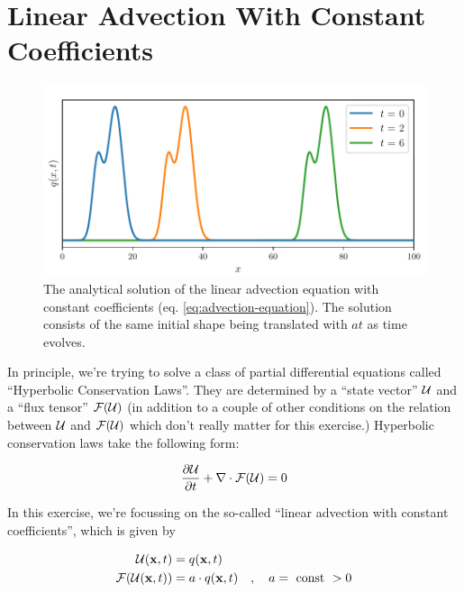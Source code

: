 \section{Linear Advection With Constant Coefficients}\label{chap:advection}


\begin{figure}[htbp]
	\includegraphics[width=\textwidth]{figures/linear_advection_solution.pdf}%
	\caption{
		The analytical solution of the linear advection equation with constant
		coefficients (eq. \ref{eq:advection-equation}). The solution consists
		of the same initial shape being translated with $a t$ as time evolves.
	}
	\label{fig:advection-analytical-solution}
\end{figure}


In principle, we're trying to solve a class of partial differential equations called
``Hyperbolic Conservation Laws''. They are determined by a ``state vector'' $\mathcal{U}$ and
a ``flux tensor'' $\mathcal{F}(\mathcal{U})$ (in addition to a couple of other conditions on the relation between
$\mathcal{U}$ and $\mathcal{F}(\mathcal{U})$ which don't really matter for this exercise.) Hyperbolic conservation
laws take the following form:

\begin{equation}
	\frac{\partial  \mathcal{U} }{\partial t} + \nabla \cdot \mathcal{F} (\mathcal{U}) = 0
\end{equation}

In this exercise, we're focussing on the so-called ``linear advection with constant
coefficients'', which is given by

\begin{align}
	\mathcal{U}(\mathbf{x}, t) &= q(\mathbf{x}, t) \\
	\mathcal{F}(\mathcal{U}(\mathbf{x}, t)) &= a \cdot q(\mathbf{x}, t) \quad , \quad a = \text{ const } > 0
\end{align}

